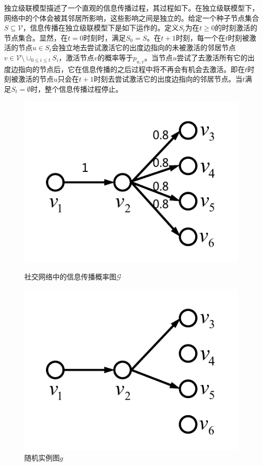 独立级联模型描述了一个直观的信息传播过程，其过程如下。在独立级联模型下，网络中的个体会被其邻居所影响，这些影响之间是独立的。给定一个种子节点集合$S \subseteq \mathcal{V}$，信息传播在独立级联模型下是如下运作的。定义$S_t$为在$t \geq 0$的时刻激活的节点集合。显然，在$t=0$时刻时，满足$S_0=S$。在$t+1$时刻，每一个在$t$时刻被激活的节点$u \in S_t$会独立地去尝试激活它的出度边指向的未被激活的邻居节点$v \in \mathcal{V} \setminus \cup_{0 \leq i \leq t}S_i$，激活节点$v$的概率等于$p_{u,v}$。当节点$u$尝试了去激活所有它的出度边指向的节点后，它在信息传播的之后过程中将不再会有机会去激活。即在$t$时刻被激活的节点$u$只会在$t+1$时刻去尝试激活它的出度边指向的邻居节点。当$t$满足$S_t = \emptyset$时，整个信息传播过程停止。

\begin{figure}[ht]
   \begin{minipage}{0.48\textwidth}
     \centering
     \includegraphics[width=0.8\linewidth]{figures/tinyGraph.pdf}
     \caption{社交网络中的信息传播概率图$\mathcal{G}$}\label{fig:tinyGraph}
   \end{minipage}
   \hfill
   \begin {minipage}{0.48\textwidth}
     \centering
     \includegraphics[width=0.8\linewidth]{figures/tinyRandomGraph.pdf}
     \caption{随机实例图$g$}\label{fig:tinyRandomGraph}
   \end{minipage}
\end{figure}

